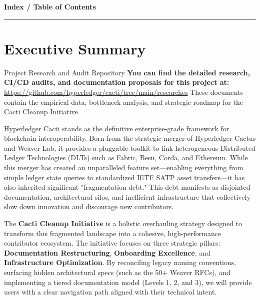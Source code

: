 \vspace{0.5cm}

\begin{center}
    {\Large\bfseries\color{primary} Index / Table of Contents}
\end{center}

\vspace{0.2cm}
\begin{center}
    \textcolor{secondary}{\rule{0.5\textwidth}{0.3pt}}
\end{center}
\vspace{0.3cm}

\tableofcontents

\newpage
\section{Executive Summary}
\begin{pocbox}{Project Research and Audit Repository}
    \textbf{You can find the detailed research, CI/CD audits, and documentation proposals for this project at:} \\
    \url{https://github.com/hyperledger/cacti/tree/main/researches}
    \vspace{0.2cm}
    These documents contain the empirical data, bottleneck analysis, and strategic roadmap for the Cacti Cleanup Initiative.
\end{pocbox}
\vspace{0.5cm}

Hyperledger Cacti stands as the definitive enterprise-grade framework for blockchain interoperability. Born from the strategic merger of Hyperledger Cactus and Weaver Lab, it provides a pluggable toolkit to link heterogeneous Distributed Ledger Technologies (DLTs) such as Fabric, Besu, Corda, and Ethereum. While this merger has created an unparalleled feature set—enabling everything from simple ledger state queries to standardized IETF SATP asset transfers—it has also inherited significant "fragmentation debt." This debt manifests as disjointed documentation, architectural silos, and inefficient infrastructure that collectively slow down innovation and discourage new contributors.

The \textbf{Cacti Cleanup Initiative} is a holistic overhauling strategy designed to transform this fragmented landscape into a cohesive, high-performance contributor ecosystem. The initiative focuses on three strategic pillars: \textbf{Documentation Restructuring}, \textbf{Onboarding Excellence}, and \textbf{Infrastructure Optimization}. By reconciling legacy naming conventions, surfacing hidden architectural specs (such as the 50+ Weaver RFCs), and implementing a tiered documentation model (Levels 1, 2, and 3), we will provide users with a clear navigation path aligned with their technical intent. 

